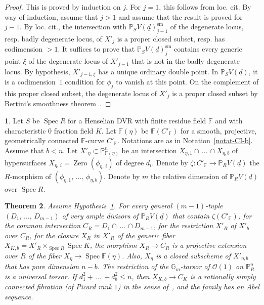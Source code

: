 \documentclass[11pt]{article}
\newtheorem{theo}{Theorem}[section]
\theoremstyle{definition}
\newcommand{\enoncename}{}
\newtheorem{corpusenonce}[theo]{\enoncename}
\newenvironment{enonce}[1]{\renewcommand{\enoncename}{#1}\begin{corpusenonce}}{\end{corpusenonce}}
\numberwithin{equation}{section}
\numberwithin{figure}{section}
\numberwithin{table}{section}
\newcommand{\mbb}{\mathbb}
\newcommand{\PP}{\mbb{P}}
\newcommand{\FF}{\mbb{F}}
\newcommand{\mc}{\mathcal}
\newcommand{\OO}{\mc{O}}
\newcommand{\ul}{\underline}
\newcommand{\Gm}[1]{\mathbb{G}_{#1}}
\newcommand{\Xx}{X}
\newcommand{\Cc}{C}
\newcommand{\FR}{K}
\newcommand{\cb}{b}
\DeclareMathOperator{\SP}{Spec}
\DeclareMathOperator{\sm}{sm}
\DeclareMathOperator{\Zero}{Zero}
\newcommand*{\MK}{\mkern 2mu}
\begin{document}
\begin{proof}
This is proved by induction on $j$. For $j=1$, this follows from loc. cit. By way of induction, assume that $j>1$ and assume that the result is proved for $j-1$. By loc. cit., the intersection with $\PP_S V(\ul{d})^{\sm}_{j-1}$ of the degenerate locus, resp. badly degenerate locus, of $\Xx'_j$ is a proper closed subset, resp. has codimension $>1$. It suffices to prove that $\PP_S V(\ul{d})^{\sm}_j$ contains every generic point $\xi$ of the degenerate locus of $\Xx'_{j-1}$ that is not in the badly degenerate locus. By hypothesis, $\Xx'_{j-1,\xi}$ has a unique ordinary double point. In $\PP_S V(\ul{d})$, it is a codimension~$1$ condition for $\phi_j$ to vanish at this point. On the complement of this proper closed subset, the degenerate locus of $\Xx'_j$ is a proper closed subset by Bertini's smoothness theorem~\cite[Theorème~6.3$\MK$(2)]{Jou}.
\end{proof}

\begin{enonce}
{Hypothesis} \label{hyp-CI-b}
Let $S$ be $\SP R$ for a Henselian DVR with finite residue field $\FF$ and with characteristic $0$ fraction field $\FR$. Let $\FF(\eta)$ be $\FF(\Cc'_{\FF})$ for a smooth, projective, geometrically connected $\FF$-curve $\Cc'_{\FF}$. Notations are as in Notation~\ref{notat-CI-b}. Assume that $\cb<n$. Let $\Xx'_\eta \subset
\PP^n_{\FF(\eta)}$ be an intersection $\Xx_{\eta,1}\cap\,\dots\,
\cap \Xx_{\eta,\cb}$ of hypersurfaces $\Xx_{\eta,\,i}=\Zero(\phi_{\eta,\,i})$ of degree $d_i$. Denote by $\zeta:\Cc'_{\FF}\to \PP_R V(\ul{d})$ the $R$-morphism of $(\phi_{\eta,1},\,\dots,\,\phi_{\eta,\cb})$. Denote by $m$ the relative dimension of $\PP_R V(\ul{d})$ over $\SP R$.
\end{enonce}

\begin{theo}
\cite{DeLand,dJHS} \label{thm-TsenLang}
Assume Hypothesis~\ref{hyp-CI-b}. For every general $(m-1)$-tuple $(D_1,\,\dots,\,D_{m-1})$ of very ample divisors of $\PP_R V(\ul{d})$ that contain $\zeta(\Cc'_{\FF})$, for the common intersection $\Cc_R = D_1\cap \,\dots\,\cap D_{m-1}$, for the restriction $\Xx'_R$ of $\Xx'_\cb$ over $\Cc_R$, for the closure $\Xx_R$ in $\Xx'_R$ of the generic fiber $\Xx_{\FR,\cb} = \Xx'_R\times_{\SP R} \SP \FR$, the morphism $\Xx_R\to \Cc_R$ is a projective extension over $R$ of the fiber $\Xx_\eta \to \SP \FF(\eta)$. Also, $\Xx_\eta$ is a closed subscheme of $\Xx'_{\eta,\cb}$ that has pure dimension $n-\cb$. The restriction of the $\Gm{m}$-torsor of $\OO(1)$ on $\PP^n_R$ is a universal torsor. If $d_1^2 +\,\dots\,+ d_\cb^2 \leq n$, then $\Xx_{\FR,\cb}\to \Cc_{\FR}$ is a rationally simply connected fibration (of Picard rank $1$) in the sense of~\cite[Theorem~13.1]{dJHS}, and the family has an Abel sequence.
\end{theo}
\end{document}

